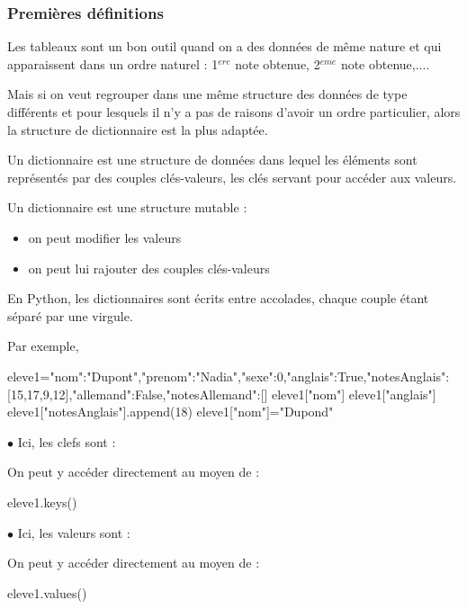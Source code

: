 \documentclass[11pt,a4paper,french,twoside]{PMCours}
\begin{document}
\subsubsection*{Premières définitions} 
Les tableaux sont un bon outil quand on a des données de même nature et qui apparaissent 
dans un ordre naturel : 1$^{ere}$ note obtenue, 2$^{eme}$ note obtenue,.... 

Mais si on veut regrouper dans une même structure des données de type différents 
et pour lesquels il n'y a pas de raisons d'avoir un ordre particulier, alors la 
structure de dictionnaire est la plus adaptée. 
\begin{Definition}{} Un dictionnaire est une structure de données dans lequel 
les éléments sont représentés par des couples clés-valeurs, les clés servant pour 
accéder aux valeurs.

Un dictionnaire est une structure mutable :
	\begin{itemize}
	\item on peut modifier les valeurs
	\item on peut lui rajouter des couples clés-valeurs
	\end{itemize}
\end{Definition}

En Python, les dictionnaires sont écrits entre accolades, chaque couple 
 étant séparé par une virgule. 

Par exemple,
\begin{Python}
eleve1={"nom":"Dupont","prenom":"Nadia","sexe":0,"anglais":True,"notesAnglais":[15,17,9,12],"allemand":False,"notesAllemand":[]}
eleve1["nom"]
eleve1["anglais"]
eleve1["notesAnglais"].append(18)
eleve1["nom"]="Dupond"
\end{Python}

$\bullet$ Ici, les clefs sont :


On peut y accéder directement au moyen de :
\begin{Python}
eleve1.keys()
\end{Python}

$\bullet$ Ici, les valeurs sont :


On peut y accéder directement au moyen de :
\begin{Python}
eleve1.values()
\end{Python}
\end{document}
